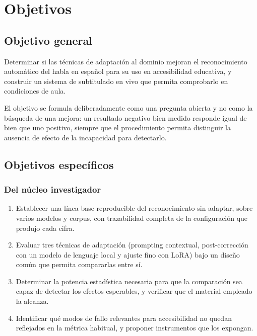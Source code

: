 \chapter{Objetivos}
\label{cap:objetivos}

\section{Objetivo general}

Determinar si las técnicas de adaptación al dominio mejoran el reconocimiento automático
del habla en español para su uso en accesibilidad educativa, y construir un sistema de
subtitulado en vivo que permita comprobarlo en condiciones de aula.

El objetivo se formula deliberadamente como una pregunta abierta y no como la búsqueda de
una mejora: un resultado negativo bien medido responde igual de bien que uno positivo,
siempre que el procedimiento permita distinguir la ausencia de efecto de la incapacidad
para detectarlo.

\section{Objetivos específicos}

\subsection*{Del núcleo investigador}

\begin{enumerate}
  \item Establecer una línea base reproducible del reconocimiento sin adaptar, sobre varios
        modelos y corpus, con trazabilidad completa de la configuración que produjo cada
        cifra.
  \item Evaluar tres técnicas de adaptación (prompting contextual, post-corrección con un
        modelo de lenguaje local y ajuste fino con LoRA) bajo un diseño común que permita
        compararlas entre sí.
  \item Determinar la potencia estadística necesaria para que la comparación sea capaz de
        detectar los efectos esperables, y verificar que el material empleado la alcanza.
  \item Identificar qué modos de fallo relevantes para accesibilidad no quedan reflejados
        en la métrica habitual, y proponer instrumentos que los expongan.
\end{enumerate}

